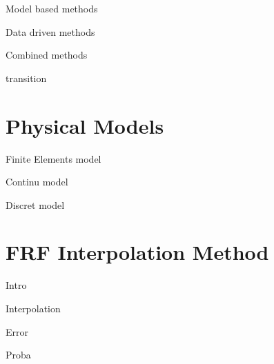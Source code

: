 \documentclass{beamer}
\begin{document}
\begin{frame}{Model based methods}
\end{frame}


\begin{frame}{Data driven methods}
\end{frame}


\begin{frame}{Combined methods}
\end{frame}


\begin{frame}{transition}
\end{frame}


\section{Physical Models}


\begin{frame}{Finite Elements model}
\end{frame}


\begin{frame}{Continu model}
\end{frame}


\begin{frame}{Discret model}
\end{frame}

\section{FRF Interpolation Method}


\begin{frame}{Intro}
\end{frame}


\begin{frame}{Interpolation}
\end{frame}


\begin{frame}{Error}
\end{frame}

\begin{frame}{Proba}
\end{frame}

\end{document}

